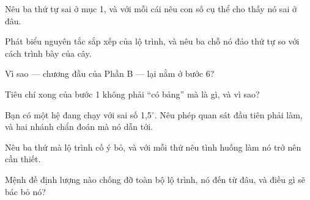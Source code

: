\documentclass[../../marker.tex]{subfiles}
\begin{document}
\begin{tukiem}
\item Nêu ba thứ tự sai ở mục 1, và với mỗi cái nêu con số cụ thể cho thấy nó sai ở đâu.
\item Phát biểu nguyên tắc sắp xếp của lộ trình, và nêu ba chỗ nó đảo thứ tự so với cách trình bày của cây.
\item Vì sao  --- chương đầu của Phần B --- lại nằm ở bước 6?
\item Tiêu chí xong của bước 1 không phải ``có bảng'' mà là gì, và vì sao?
\item Bạn có một hệ đang chạy với sai số 1,5\(^\circ\). Nêu phép quan sát đầu tiên phải làm, và hai nhánh chẩn đoán mà nó dẫn tới.
\item Nêu ba thứ mà lộ trình cố ý bỏ, và với mỗi thứ nêu tình huống làm nó trở nên cần thiết.
\item Mệnh đề định lượng nào chống đỡ toàn bộ lộ trình, nó đến từ đâu, và điều gì sẽ bác bỏ nó?
\end{tukiem}
\ifSubfilesClassLoaded{\printbibliography[title={Nguồn}]}{}
\end{document}
